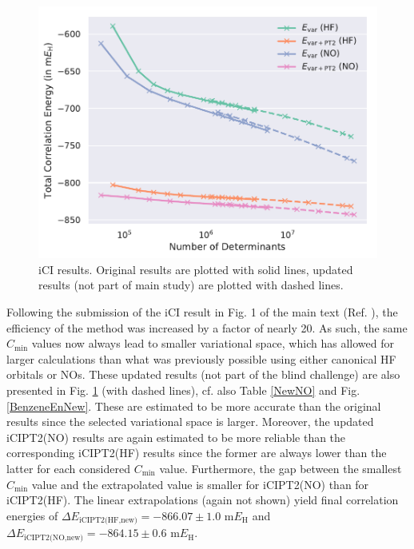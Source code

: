 \documentclass[journal=jcp,manuscript=suppinfo]{achemso}
\begin{document}
%
\begin{figure}[ht!]
\begin{center}
\includegraphics[scale=0.75]{figures/ici/ici.pdf}
\caption{iCI results. Original results are plotted with solid lines, updated results (not part of main study) are plotted with dashed lines.}
\label{ici_SI_fig}
\end{center}
\vspace{-0.6cm}
\end{figure}
%
Following the submission of the iCI result in Fig. 1 of the main text (Ref. ), the efficiency of the method was increased by a factor of nearly 20. As such, the same $C_{\text{min}}$ values now always lead to smaller variational space, which has allowed for larger calculations than what was previously possible using either canonical HF orbitals or NOs. These updated results (not part of the blind challenge) are also presented in Fig. \ref{ici_SI_fig} (with dashed lines), cf. also Table \ref{NewNO} and Fig. \ref{BenzeneEnNew}. These are estimated to be more accurate than the original results since the selected variational space is larger. Moreover, the updated iCIPT2(NO) results are again estimated to be more reliable than the corresponding iCIPT2(HF) results since the former are always lower than the latter for each considered $C_{\text{min}}$ value. Furthermore, the gap between the smallest $C_{\text{min}}$ value and the extrapolated value is smaller for iCIPT2(NO) than for iCIPT2(HF). The linear extrapolations (again not shown) yield final correlation energies of $\Delta E_{\text{iCIPT2(HF,new)}} = -866.07\pm1.0$ m$E_{\text{H}}$ and $\Delta E_{\text{iCIPT2(NO,new)}} = -864.15\pm0.6$ m$E_{\text{H}}$.\\
\end{document}
